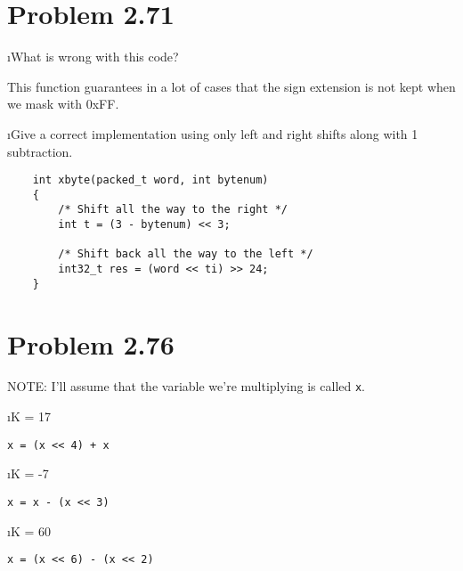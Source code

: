 \documentclass[fleqn]{article}
\begin{document}

\section*{Problem 2.71}

\bee
\i What is wrong with this code?

 \begin{solution}
   This function guarantees in a lot of cases that the sign extension is not kept when we mask with 0xFF.
 \end{solution}

\i Give a correct implementation using only left and right shifts along with 1 subtraction.

 \begin{solution}
 	\begin{verbatim}
 	int xbyte(packed_t word, int bytenum)
 	{
        /* Shift all the way to the right */
        int t = (3 - bytenum) << 3;
 			
        /* Shift back all the way to the left */
        int32_t res = (word << ti) >> 24;
 	}
 	\end{verbatim}
 \end{solution}

\ene

\section*{Problem 2.76}

NOTE: I'll assume that the variable we're multiplying is called \texttt{x}.

\bee
\i K = 17

 \begin{solution}
   \texttt{x = (x << 4) + x}
 \end{solution}

\i K = -7

 \begin{solution}
   \texttt{x = x - (x << 3)}
 \end{solution}

\i K = 60

 \begin{solution}
   \texttt{x = (x << 6) - (x << 2)}
 \end{solution}
\end{document}
